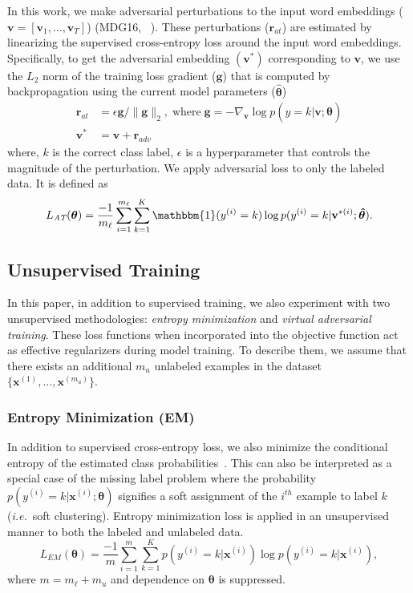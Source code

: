 \documentclass[letterpaper]{article}
\newcommand{\citep}{\cite}
\newcommand{\citealp}[1]{\citeauthor{#1} \citeyear{#1}}
\begin{document}
In this work, we make adversarial perturbations to the input word embeddings ($\mathbf{v} = [\mathbf{v}_1,\ldots,\mathbf{v}_T]$) (MDG16,~\citealp{miyato2016adversarial}). These perturbations ($\mathbf{r}_{\textit{at}}$) are estimated by linearizing the supervised cross-entropy loss around the input word embeddings. Specifically, to get the adversarial embedding $(\mathbf{v}^*)$ corresponding to $\mathbf{v}$, we use the $L_2$ norm of the training loss gradient ($\mathbf{g}$) that is computed by backpropagation using the current model parameters ($\boldsymbol{\hat{\theta}}$)
\begin{align*}
\mathbf{r}_{\textit{at}} &= \epsilon \mathbf{g}/\|\mathbf{g}\|_2,\;\text{where}\;\mathbf{g} = -\nabla_{\mathbf{v}}\log p(y=k|\mathbf{v};\boldsymbol{\hat{\theta}})\\
\mathbf{v}^{*} &= \mathbf{v} + \mathbf{r}_{\textit{adv}}
\end{align*}
where, $k$ is the correct class label, $\epsilon$ is a hyperparameter that controls the magnitude of the perturbation. We apply adversarial loss to only the labeled data. It is defined as
\begin{align*}
L_{\textit{AT}}(\boldsymbol{\theta}) = \frac{-1}{m_{\ell}}
\sum_{i=1}^{m_{\ell}}\sum_{k=1}^{K} \mathbbm{1}(y^{(i)}=k)\log p(y^{(i)}=k|\mathbf{v}^{*(i)}; \boldsymbol{\hat{\theta}}).
\end{align*}

\subsection{Unsupervised Training}
In this paper, in addition to supervised training, we also experiment with two unsupervised methodologies: \emph{entropy minimization} and \emph{virtual adversarial training}.  These loss functions when incorporated into the objective function act as effective regularizers during model training. To describe them, we assume that there exists an additional $\textit{m}_\textit{u}$ unlabeled examples in the dataset $\{\mathbf{x}^{(1)},\ldots, \mathbf{x}^{(\textit{m}_{\textit{u}})}\}$.

\subsubsection{\textbf{Entropy Minimization (EM)}} In addition to supervised cross-entropy loss, we also minimize the conditional entropy of the estimated class probabilities~\citep{grandvalet2005semi,miyato2017virtual}. This can also be interpreted as a special case of the missing label problem where the probability $p(y^{(i)}=k|\mathbf{x}^{(i)};\boldsymbol{\theta})$ signifies a soft assignment of the $i^{th}$ example to label $k$ (\emph{i.e.}\ soft clustering). Entropy minimization loss is applied in an unsupervised manner to both the labeled and unlabeled data.
\begin{equation*}
L_{\textit{EM}}(\boldsymbol{\theta}) = \frac{-1}{m} \sum_{i=1}^{m} \sum_{k=1}^{\textit{K}} p(y^{(i)}=k|\mathbf{x}^{(i)})\log p(y^{(i)}=k|\mathbf{x}^{(i)}),
\end{equation*}
where $m = {m_{\ell} + m_{\textit{u}}}$ and dependence on $\boldsymbol{\theta}$ is suppressed.
\end{document}
